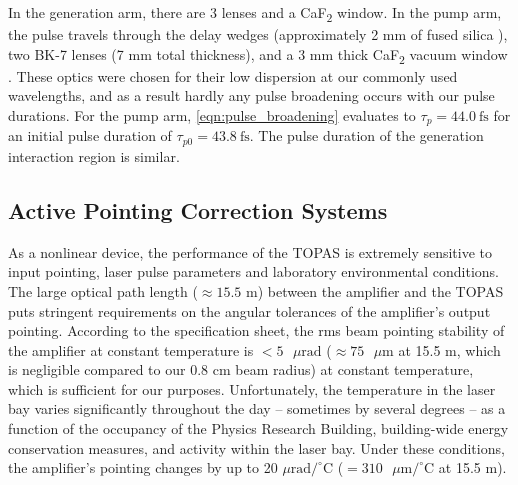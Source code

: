 In the generation arm, there are 3 lenses and a CaF\textsubscript{2} window. In the pump arm, the pulse travels through the delay wedges (approximately 2 mm of fused silica \cite{malitsonInterspecimenComparisonRefractive1965}), two BK-7 lenses (7 mm total thickness), and a 3 mm thick CaF\textsubscript{2} vacuum window \cite{daimonHighaccuracyMeasurementsRefractive2002}. These optics were chosen for their low dispersion at our commonly used wavelengths, and as a result hardly any pulse broadening occurs with our pulse durations. For the pump arm, \cref{eqn:pulse_broadening} evaluates to $\tau_p = 44.0 \ \textrm{fs}$ for an initial pulse duration of $\tau_{p0} = 43.8 \ \textrm{fs}$. The pulse duration of the generation interaction region is similar.

\subsection{Active Pointing Correction Systems}

As a nonlinear device, the performance of the TOPAS is extremely sensitive to input pointing, laser pulse parameters and laboratory environmental conditions. The large optical path length ($\approx 15.5$ m) between the amplifier and the TOPAS puts stringent requirements on the angular tolerances of the amplifier's output pointing. According to the specification sheet, the rms beam pointing stability of the amplifier at constant temperature is $<5\text{ } \mu \text{rad}$ ($\approx 75 \text{ } \mu \text{m}$ at 15.5 m, which is negligible compared to our 0.8 cm beam radius) at constant temperature, which is sufficient for our purposes. Unfortunately, the temperature in the laser bay varies significantly throughout the day -- sometimes by several degrees -- as a function of the occupancy of the Physics Research Building, building-wide energy conservation measures, and activity within the laser bay. Under these conditions, the amplifier's pointing changes by up to 20 $\mu \text{rad} / ^{\circ} \text{C}$ ($= 310 \text{ } \mu \text{m}/ ^{\circ} \text{C}$ at 15.5 m).

